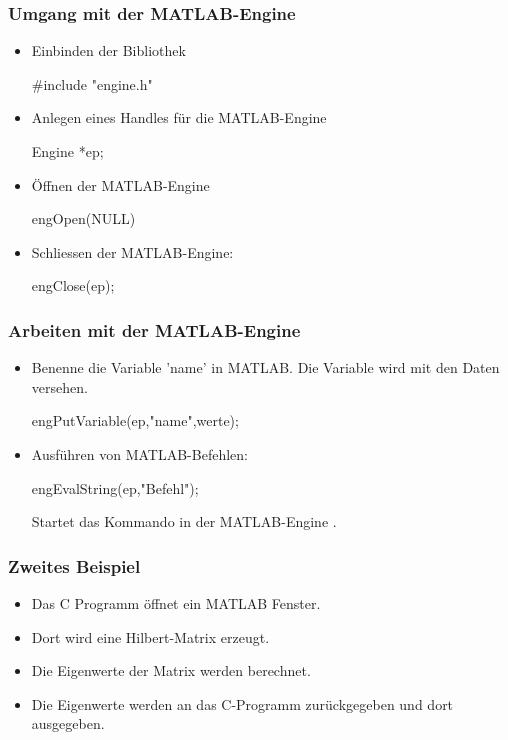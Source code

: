 \documentclass[hyperref={xetex}]{beamer}
\begin{document}
\begin{frame}[fragile]\frametitle{Umgang mit der MATLAB-Engine}
\begin{itemize}
\item Einbinden der Bibliothek 
\begin{matlabin}[language=C++]
#include "engine.h"
\end{matlabin}
\item Anlegen eines Handles f\"ur die MATLAB-Engine
\begin{matlabin}[language=C++]
Engine *ep;
\end{matlabin}
\item \"Offnen der MATLAB-Engine
\begin{matlabin}[language=C++]
engOpen(NULL) 
\end{matlabin} 
\item Schliessen der MATLAB-Engine: 
\begin{matlabin}[language=C++]
engClose(ep);
\end{matlabin}
\end{itemize}
\end{frame}
%
%
\begin{frame}[fragile]\frametitle{Arbeiten mit der MATLAB-Engine}
\begin{itemize}
\item  Benenne die Variable 'name' in MATLAB. Die Variable wird mit den Daten
 versehen. 
\begin{matlabin}[language=C++]
 engPutVariable(ep,"name",werte);
\end{matlabin}
\item Ausf\"uhren von MATLAB-Befehlen:
\begin{matlabin}[language=C++]
engEvalString(ep,"Befehl");
\end{matlabin}
Startet das Kommando  in der MATLAB-Engine .
\end{itemize}
\end{frame}
%
%
\begin{frame}[fragile]\frametitle{Zweites Beispiel}
\begin{itemize}
\item Das C Programm \"offnet ein MATLAB Fenster.
\item Dort wird eine Hilbert-Matrix erzeugt.
\item Die Eigenwerte der Matrix werden berechnet.
\item Die Eigenwerte werden an das C-Programm zur\"uckgegeben und dort
  ausgegeben. 
\end{itemize}
\end{frame}
\end{document}
